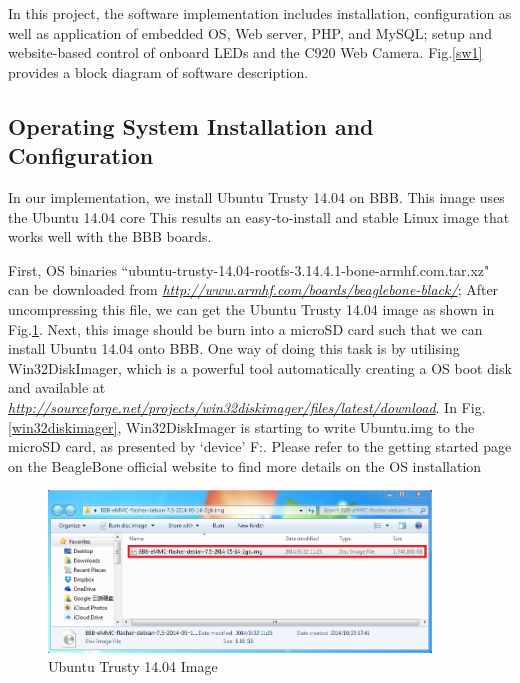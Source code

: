 \documentclass[12pt,journal,draftclsnofoot,onecolumn]{IEEEtran}
\begin{document}
In this project, the software implementation includes installation, configuration as well as application of embedded OS, Web server, PHP, and MySQL; setup and website-based control of onboard LEDs and the C920 Web Camera. Fig.\ref{sw1} provides a block diagram of software description.

	\subsection{Operating System Installation and Configuration}\label{Sys}
	In our implementation, we install Ubuntu Trusty 14.04 on BBB. This image uses the Ubuntu 14.04 core This results an easy-to-install and stable Linux image that works well with the BBB boards.

First, OS binaries ``ubuntu-trusty-14.04-rootfs-3.14.4.1-bone-armhf.com.tar.xz" can be downloaded from \textcolor{blue}{\textit{\url{http://www.armhf.com/boards/beaglebone-black/}}}; After uncompressing this file, we can get the Ubuntu Trusty 14.04 image as shown in Fig.\ref{osimage}. Next, this image should be burn into a microSD card such that we can install Ubuntu 14.04 onto BBB. One way of doing this task is by utilising Win32DiskImager, which is a powerful tool automatically creating a OS boot disk and available at \textcolor{blue}{\textit{\url{http://sourceforge.net/projects/win32diskimager/files/latest/download}}}. In Fig.\ref{win32diskimager}, Win32DiskImager is starting to write Ubuntu.img to the microSD card, as presented by `device' F:. Please refer to the getting started page on the BeagleBone official website \cite{startBB} to find more details on the OS installation

\begin{figure}[htb]
	\centering
	\includegraphics[width=4in]{./figs/osimage.PNG}
	\caption{Ubuntu Trusty 14.04 Image}
	\label{osimage}
\end{figure}
\end{document}

